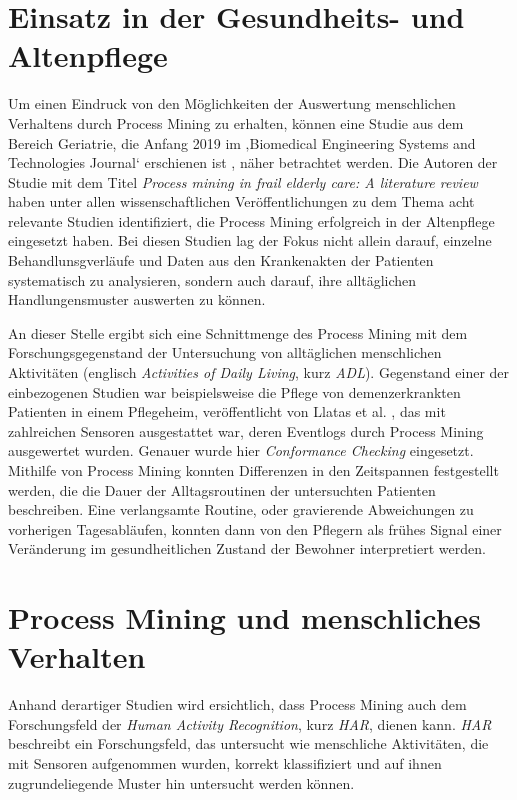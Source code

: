 \section{Einsatz in der Gesundheits- und Altenpflege}
Um einen Eindruck von den Möglichkeiten der Auswertung menschlichen Verhaltens durch Process Mining zu erhalten, können eine Studie aus dem Bereich Geriatrie, die Anfang 2019 im ‚Biomedical Engineering Systems and Technologies Journal‘ erschienen ist \cite{wrro141683}, näher betrachtet werden. Die Autoren der Studie mit dem Titel \textit{Process mining in frail elderly care: A literature review} haben unter allen wissenschaftlichen Veröffentlichungen zu dem Thema acht relevante Studien identifiziert, die Process Mining erfolgreich in der Altenpflege eingesetzt haben. Bei diesen Studien lag der Fokus nicht allein darauf, einzelne Behandlunsgverläufe und Daten aus den Krankenakten der Patienten systematisch zu analysieren, sondern auch darauf, ihre alltäglichen Handlungensmuster auswerten zu können. 

An dieser Stelle ergibt sich eine Schnittmenge des Process Mining mit dem Forschungsgegenstand der Untersuchung von alltäglichen menschlichen Aktivitäten (englisch \textit{Activities of Daily Living}, kurz \textit{ADL}). 
Gegenstand einer der einbezogenen Studien war beispielsweise die Pflege von demenzerkrankten Patienten in einem Pflegeheim, veröffentlicht von Llatas et al. \cite{llatas}, das mit zahlreichen Sensoren ausgestattet war, deren Eventlogs durch Process Mining ausgewertet wurden. Genauer wurde hier \textit{Conformance Checking} eingesetzt. Mithilfe von Process Mining konnten Differenzen in den Zeitspannen festgestellt werden, die die Dauer der Alltagsroutinen der untersuchten Patienten beschreiben. Eine verlangsamte Routine, oder gravierende Abweichungen zu vorherigen Tagesabläufen, konnten dann von den Pflegern als frühes Signal einer Veränderung im gesundheitlichen Zustand der Bewohner interpretiert werden.

\section{Process Mining und menschliches Verhalten}\label{har}
Anhand derartiger Studien wird ersichtlich, dass Process Mining auch dem Forschungsfeld der \textit{Human Activity Recognition}, kurz \textit{HAR}, dienen kann. \textit{HAR} beschreibt ein Forschungsfeld, das untersucht wie menschliche Aktivitäten, die mit Sensoren aufgenommen wurden, korrekt klassifiziert und auf ihnen zugrundeliegende Muster hin untersucht werden können. 

